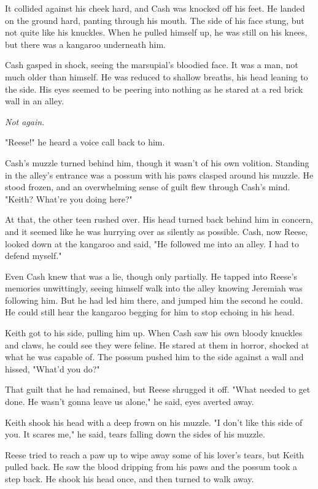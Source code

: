 It collided against his cheek hard, and Cash was knocked off his feet. He landed on the ground hard, panting through his mouth. The side of his face stung, but not quite like his knuckles. When he pulled himself up, he was still on his knees, but there was a kangaroo underneath him.

Cash gasped in shock, seeing the marsupial's bloodied face. It was a man, not much older than himself. He was reduced to shallow breaths, his head leaning to the side. His eyes seemed to be peering into nothing as he stared at a red brick wall in an alley.

\emph{Not again}.

"Reese!" he heard a voice call back to him.

Cash's muzzle turned behind him, though it wasn't of his own volition. Standing in the alley's entrance was a possum with his paws clasped around his muzzle. He stood frozen, and an overwhelming sense of guilt flew through Cash's mind. "Keith? What're you doing here?"

At that, the other teen rushed over. His head turned back behind him in concern, and it seemed like he was hurrying over as silently as possible. Cash, now Reese, looked down at the kangaroo and said, "He followed me into an alley. I had to defend myself."

Even Cash knew that was a lie, though only partially. He tapped into Reese's memories unwittingly, seeing himself walk into the alley knowing Jeremiah was following him. But he had led him there, and jumped him the second he could. He could still hear the kangaroo begging for him to stop echoing in his head.

Keith got to his side, pulling him up. When Cash saw his own bloody knuckles and claws, he could see they were feline. He stared at them in horror, shocked at what he was capable of. The possum pushed him to the side against a wall and hissed, "What'd you do?"

That guilt that he had remained, but Reese shrugged it off. "What needed to get done. He wasn't gonna leave us alone," he said, eyes averted away.

Keith shook his head with a deep frown on his muzzle. "I don't like this side of you. It scares me," he said, tears falling down the sides of his muzzle.

Reese tried to reach a paw up to wipe away some of his lover's tears, but Keith pulled back. He saw the blood dripping from his paws and the possum took a step back. He shook his head once, and then turned to walk away.

